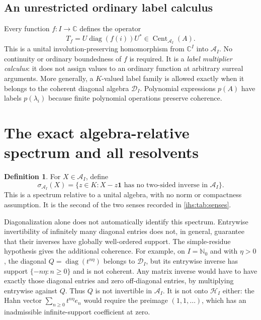 \documentclass[11pt,a4paper]{article}
\numberwithin{equation}{section}
\theoremstyle{definition}
\newtheorem{definition}[definition]{Definition}
\theoremstyle{remark}
\newcommand{\C}{\mathbb C}
\newcommand{\N}{\mathbb N}
\newcommand{\K}{K}
\newcommand{\Hrf}{\mathcal H_I}
\newcommand{\Arf}{\mathcal A_I}
\newcommand{\Dg}{\mathcal D_I}
\newcommand{\diag}{\operatorname{diag}}
\newcommand{\Cent}{\operatorname{Cent}}
\newcommand{\Id}{\mathbf 1}
\begin{document}
\subsection{An unrestricted ordinary label calculus}\label{ihs:rf:sec:labels}
Every function $f:I\to\C$ defines the operator
\[
 T_f=U\diag(f(i))U^*\in\Cent_{\Arf}(A).
\]
This is a unital involution-preserving homomorphism from $\C^I$ into
$\Arf$. No continuity or ordinary boundedness of $f$ is required. It is a
\emph{label multiplier calculus}: it does not assign values to an ordinary
function at arbitrary surreal arguments. More generally, a $\K$-valued label
family is allowed exactly when it belongs to the coherent diagonal algebra
$\Dg$. Polynomial expressions $p(A)$ have labels $p(\lambda_i)$ because
finite polynomial operations preserve coherence.

\section{The exact algebra-relative spectrum and all resolvents}\label{ihs:sec:resolvent}

\begin{definition}\label{ihs:rf:def:spectrum}
For $X\in\Arf$, define
\[
 \sigma_{\Arf}(X)=\{z\in\K:X-z\Id\text{ has no two-sided inverse in }\Arf\}.
\]
This is a spectrum relative to a unital algebra, with no norm or compactness
assumption. It is the second of the two senses recorded in
\cref{ihs:tab:senses}.
\end{definition}

Diagonalization alone does not automatically identify this spectrum.
Entrywise invertibility of infinitely many diagonal entries does not, in
general, guarantee that their inverses have globally well-ordered support.
The simple-residue hypothesis gives the additional coherence. For example,
on $I=\N_0$ and with $\eta>0$, the diagonal
$Q=\diag(t^{n\eta})$ belongs to $\Dg$, but its entrywise inverse has
support $\{-n\eta:n\ge0\}$ and is not coherent. Any matrix inverse would
have to have exactly those diagonal entries and zero off-diagonal entries,
by multiplying entrywise against $Q$. Thus $Q$ is not invertible in $\Arf$.
It is not onto $\Hrf$ either: the Hahn vector
$\sum_{n\ge0}t^{n\eta}e_n$ would require the preimage $(1,1,\ldots)$,
which has an inadmissible infinite-support coefficient at zero.
\end{document}
